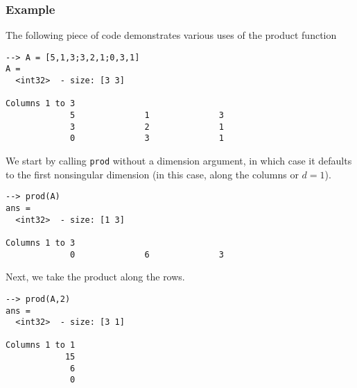 \subsubsection{Example}
The following piece of code demonstrates various uses of the product
function
\begin{verbatim}
--> A = [5,1,3;3,2,1;0,3,1]
A =
  <int32>  - size: [3 3]
  
Columns 1 to 3
             5              1              3
             3              2              1
             0              3              1
\end{verbatim}
We start by calling \verb|prod| without a dimension argument, in which case it defaults to the first nonsingular dimension (in this case, along the columns or $d = 1$).
\begin{verbatim}
--> prod(A)
ans =
  <int32>  - size: [1 3]
  
Columns 1 to 3
             0              6              3
\end{verbatim}
Next, we take the product along the rows.
\begin{verbatim}
--> prod(A,2)
ans =
  <int32>  - size: [3 1]
  
Columns 1 to 1
            15
             6
             0
\end{verbatim}
